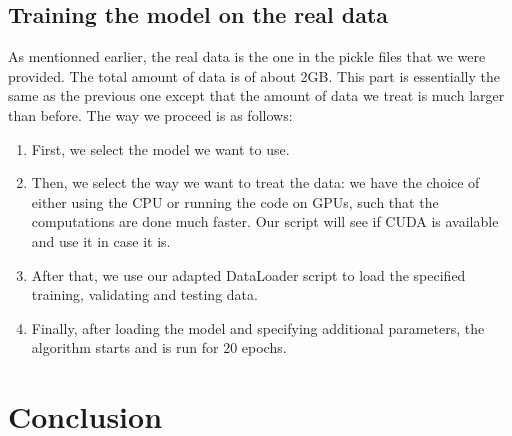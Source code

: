 \documentclass[10pt,conference]{IEEEtran}
\begin{document}
\subsection{Training the model on the real data}
As mentionned earlier, the real data is the one in the pickle files that we were provided. The total amount of data is of about 2GB. This part is essentially the same as the previous one except that the amount of data we treat is much larger than before. The way we proceed is as follows:
\begin{enumerate}
  \item First, we select the model we want to use.
  \item Then, we select the way we want to treat the data: we have the choice of either using the CPU or running the code on GPUs, such that the computations are done much faster. Our script will see if CUDA is available and use it in case it is.
  \item After that, we use our adapted DataLoader script to load the specified training, validating and testing data.
  \item Finally, after loading the model and specifying additional parameters, the algorithm starts and is run for 20 epochs.
\end{enumerate}

\section{Conclusion}



\end{document}
